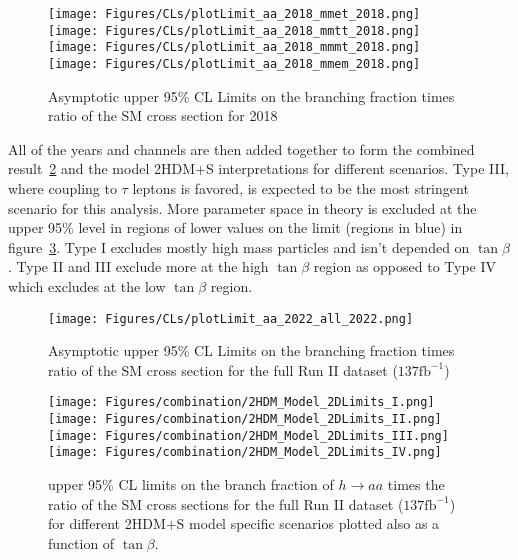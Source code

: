 \begin{figure}[ht!b]
  \centering
  \texttt{[image: Figures/CLs/plotLimit\_aa\_2018\_mmet\_2018.png]}
  \texttt{[image: Figures/CLs/plotLimit\_aa\_2018\_mmtt\_2018.png]}\\
  \texttt{[image: Figures/CLs/plotLimit\_aa\_2018\_mmmt\_2018.png]}
  \texttt{[image: Figures/CLs/plotLimit\_aa\_2018\_mmem\_2018.png]}\\
    \caption{\label{fig:CLs2018} Asymptotic upper 95\% CL Limits on the branching fraction times ratio of the SM cross section for 2018}
\end{figure}

\clearpage

All of the years and channels are then added together to form the combined result~\ref{fig:CLsRunII} and the model 2HDM+S interpretations for different scenarios. Type III, where coupling to $\tau$ leptons is favored, is expected to be the most stringent scenario for this analysis. More parameter space in theory is excluded at the upper 95\% level in regions of lower values on the limit (regions in blue) in figure~\ref{fig:2HDM}. Type I excludes mostly high mass particles and isn't depended on $\tan\beta$. Type II and III exclude more at the high $\tan\beta$ region as opposed to Type IV which excludes at the low $\tan\beta$ region.

\begin{figure}[ht!b]
\label{fig:CLsRunII} 
\centering
  \texttt{[image: Figures/CLs/plotLimit\_aa\_2022\_all\_2022.png]}
    \caption{Asymptotic upper 95\% CL Limits on the branching fraction times ratio of the SM cross section for the full Run II dataset ($\text{137}\text{fb}^{-1}$)}
\end{figure}

\begin{figure}[ht!b]
  \centering
  \texttt{[image: Figures/combination/2HDM\_Model\_2DLimits\_I.png]}
  \texttt{[image: Figures/combination/2HDM\_Model\_2DLimits\_II.png]}\\
  \texttt{[image: Figures/combination/2HDM\_Model\_2DLimits\_III.png]}
  \texttt{[image: Figures/combination/2HDM\_Model\_2DLimits\_IV.png]}\\
    \caption{\label{fig:2HDM}  upper 95\% CL limits on the branch fraction of $h\rightarrow a a $ times the ratio of the SM cross sections for the full Run II dataset ($\text{137}\text{fb}^{-1}$) for different 2HDM+S model specific scenarios plotted also as a function of $\tan\beta$.}
\end{figure}

